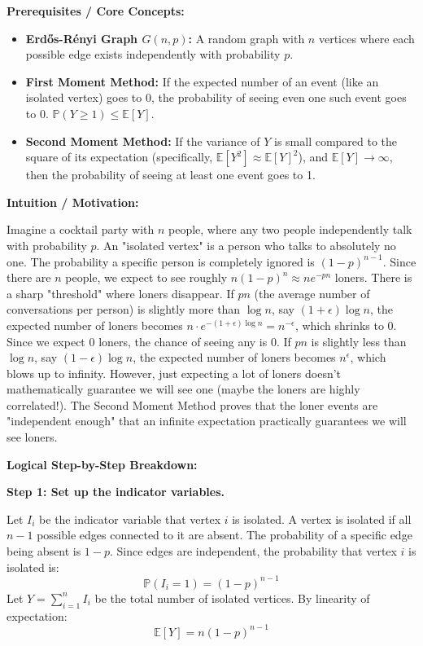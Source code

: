\begin{solution}
\textbf{Prerequisites / Core Concepts:}
\begin{itemize}
    \item \textbf{Erdős-Rényi Graph $G(n,p)$:} A random graph with $n$ vertices where each possible edge exists independently with probability $p$.
    \item \textbf{First Moment Method:} If the expected number of an event (like an isolated vertex) goes to 0, the probability of seeing even one such event goes to 0. $\mathbb{P}(Y \geq 1) \leq \mathbb{E}[Y]$.
    \item \textbf{Second Moment Method:} If the variance of $Y$ is small compared to the square of its expectation (specifically, $\mathbb{E}[Y^2] \approx \mathbb{E}[Y]^2$), and $\mathbb{E}[Y] \to \infty$, then the probability of seeing at least one event goes to 1.
\end{itemize}

\textbf{Intuition / Motivation:}

Imagine a cocktail party with $n$ people, where any two people independently talk with probability $p$. An "isolated vertex" is a person who talks to absolutely no one.
The probability a specific person is completely ignored is $(1-p)^{n-1}$. Since there are $n$ people, we expect to see roughly $n(1-p)^n \approx n e^{-pn}$ loners.
There is a sharp "threshold" where loners disappear. If $pn$ (the average number of conversations per person) is slightly more than $\log n$, say $(1+\epsilon)\log n$, the expected number of loners becomes $n \cdot e^{-(1+\epsilon)\log n} = n^{-\epsilon}$, which shrinks to 0. Since we expect 0 loners, the chance of seeing any is 0.
If $pn$ is slightly less than $\log n$, say $(1-\epsilon)\log n$, the expected number of loners becomes $n^{\epsilon}$, which blows up to infinity. However, just expecting a lot of loners doesn't mathematically guarantee we will see one (maybe the loners are highly correlated!). The Second Moment Method proves that the loner events are "independent enough" that an infinite expectation practically guarantees we will see loners.

\textbf{Logical Step-by-Step Breakdown:}

\textbf{Step 1: Set up the indicator variables.}

Let $I_i$ be the indicator variable that vertex $i$ is isolated. A vertex is isolated if all $n-1$ possible edges connected to it are absent.
The probability of a specific edge being absent is $1-p$. Since edges are independent, the probability that vertex $i$ is isolated is:
\[ \mathbb{P}(I_i = 1) = (1-p)^{n-1} \]
Let $Y = \sum_{i=1}^n I_i$ be the total number of isolated vertices. By linearity of expectation:
\[ \mathbb{E}[Y] = n(1-p)^{n-1} \]


\end{solution}
